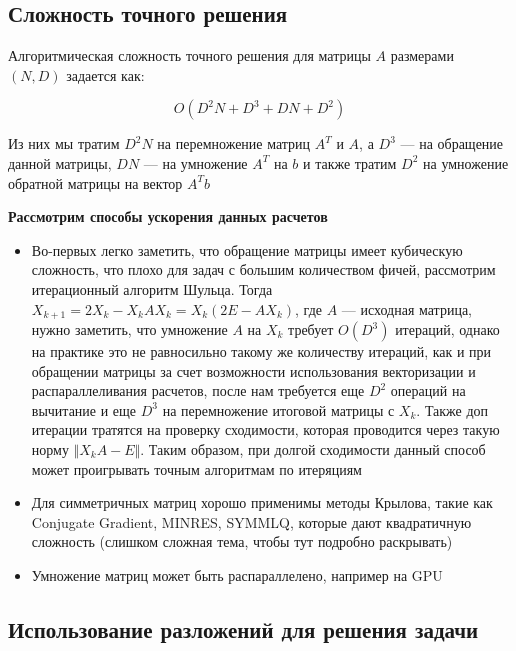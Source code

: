 \documentclass{article}
\begin{document}
    \subsection{Сложность точного решения}

    Алгоритмическая сложность точного решения для матрицы $A$ размерами $(N, D)$ задается как:

    \begin{equation}
        O(D^2N + D^3 + DN + D^{2})
    \end{equation}

    Из них мы тратим $D^{2}N$ на перемножение матриц $A^{T}$ и $A$, а $D^{3}$ --- на обращение данной матрицы,
    $DN$ --- на умножение $A^{T}$ на $b$ и также тратим $D^{2}$ на умножение обратной матрицы на вектор $A^{T}b$

    \quad

    \textbf{Рассмотрим способы ускорения данных расчетов}

    \quad

    \begin{itemize}
        \item Во-первых легко заметить, что обращение матрицы имеет кубическую сложность, что плохо для задач с большим количеством фичей, рассмотрим
        итерационный алгоритм Шульца.
        Тогда $X_{k+1} = 2 X_{k} - X_{k} A X_{k} = X_{k} (2E - A X_{k})$, где $A$ --- исходная матрица, нужно заметить, что умножение $A$ на $X_{k}$ требует
        $O(D^{3})$ итераций, однако на практике это не равносильно такому же количеству итераций, как и при обращении матрицы за счет возможности использования
        векторизации и распараллеливания расчетов, после нам требуется еще $D^{2}$ операций на вычитание и еще $D^{3}$ на перемножение итоговой матрицы с $X_{k}$.
        Также доп итерации тратятся на проверку сходимости, которая проводится через такую норму $\Vert X_{k}A - E \Vert$.
        Таким образом, при долгой сходимости данный способ может проигрывать точным алгоритмам по итеряциям
        \item Для симметричных матриц хорошо применимы методы Крылова, такие как Conjugate Gradient,
        MINRES, SYMMLQ, которые дают квадратичную сложность (слишком сложная тема, чтобы тут подробно раскрывать)
        \item Умножение матриц может быть распараллелено, например на GPU
    \end{itemize}


    \subsection{Использование разложений для решения задачи}
\end{document}
